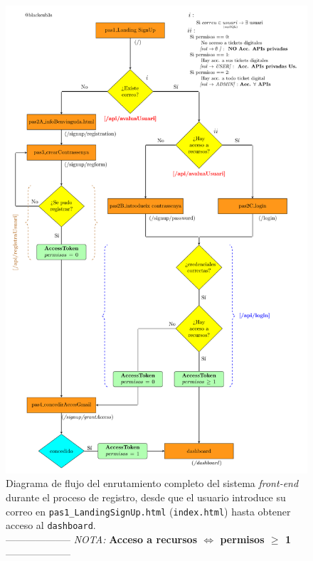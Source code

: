 \documentclass[a4paper,12pt]{report}
\begin{document}
	
	\setlength{\belowcaptionskip}{3pt}
	\FloatBarrier
	\begin{figure}[H]
		\centering
		\caption{Diagrama de flujo del enrutamiento completo del sistema \textit{front-end} durante el proceso de registro, desde que el usuario introduce su correo en \texttt{pas1\_LandingSignUp.html} (\texttt{index.html}) hasta obtener acceso al \texttt{dashboard}.\\ -------------------- \textit{NOTA:} \textbf{Acceso a recursos $\iff$ permisos $\geq$ 1} --------------------}
		\includegraphics[width=1\textwidth]{img/diagramaMercAppFront.pdf}
		
		\label{fig:diagramaMercaAppFront} 
	\end{figure}
	\FloatBarrier
	
\end{document}

